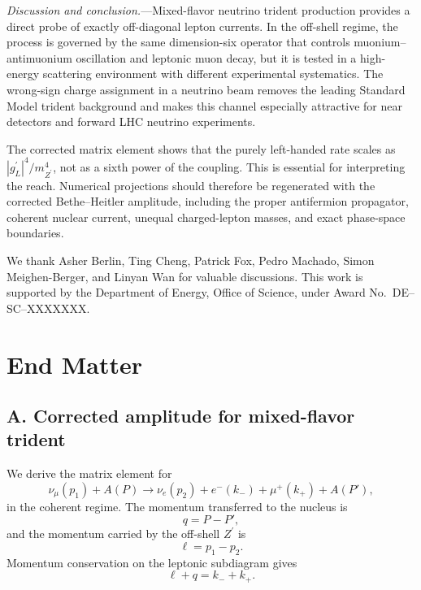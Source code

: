 \documentclass[
  aps,
  prl,
  twocolumn,
  superscriptaddress,
  amsmath, amssymb,
  floatfix, nofootinbib,
  longbibliography,
]{revtex4-2}
\newcommand{\numu}{\nu_\mu}
\newcommand{\nue}{\nu_e}
\newcommand{\Zp}{Z^{\prime}}
\newcommand{\mZp}{m_{\Zp}}
\newcommand{\gL}{{g^{\prime}_L}}
\begin{document}
\textit{Discussion and conclusion.}---Mixed-flavor neutrino trident
production provides a direct probe of exactly off-diagonal lepton
currents.  In the off-shell regime, the process is governed by the same
dimension-six operator that controls muonium--antimuonium oscillation
and leptonic muon decay, but it is tested in a high-energy scattering
environment with different experimental systematics.  The wrong-sign
charge assignment in a neutrino beam removes the leading Standard Model
trident background and makes this channel especially attractive for
near detectors and forward LHC neutrino experiments.

The corrected matrix element shows that the purely left-handed rate
scales as $|\gL|^4/\mZp^4$, not as a sixth power of the coupling.  This
is essential for interpreting the reach.  Numerical projections should
therefore be regenerated with the corrected Bethe--Heitler amplitude,
including the proper antifermion propagator, coherent nuclear current,
unequal charged-lepton masses, and exact phase-space boundaries.

\begin{acknowledgments}
We thank Asher Berlin, Ting Cheng, Patrick Fox, Pedro Machado,
Simon Meighen-Berger, and Linyan Wan for valuable discussions.
This work is supported by the Department of Energy, Office of Science,
under Award No.~DE--SC--XXXXXXX.
\end{acknowledgments}

\onecolumngrid
\appendix
\setcounter{equation}{0}
\renewcommand{\theequation}{A\arabic{equation}}

\section*{End Matter}

\subsection*{A. Corrected amplitude for mixed-flavor trident}

We derive the matrix element for
\begin{equation}
  \numu(p_1)+A(P)
  \to
  \nue(p_2)+e^-(k_-)+\mu^+(k_+)+A(P'),
\label{eq:process-em}
\end{equation}
in the coherent regime.  The momentum transferred to the nucleus is
\begin{equation}
  q=P-P',
\end{equation}
and the momentum carried by the off-shell $\Zp$ is
\begin{equation}
  \ell=p_1-p_2.
\end{equation}
Momentum conservation on the leptonic subdiagram gives
\begin{equation}
  \ell+q=k_-+k_+.
\end{equation}
\end{document}
